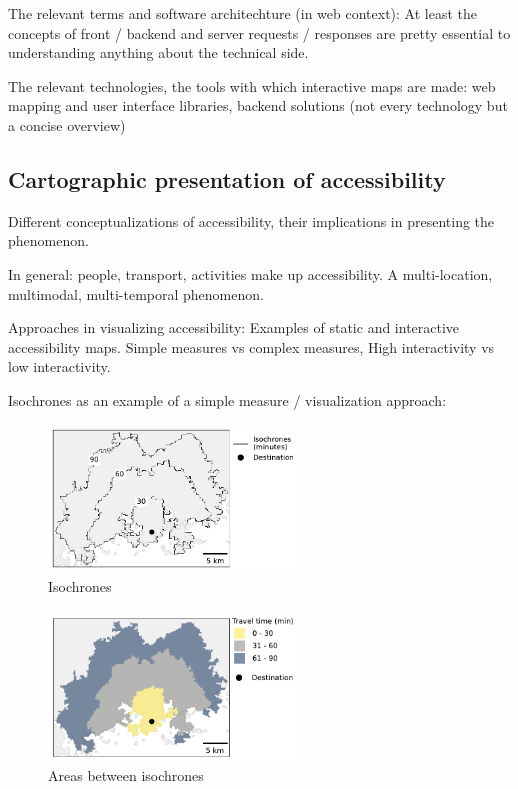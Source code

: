 The relevant terms and software architechture (in web context):
At least the concepts of front / backend and server requests / responses
are pretty essential to understanding anything about the technical side.

The relevant technologies, the tools with which interactive maps are made:
web mapping and user interface libraries, backend solutions
(not every technology but a concise overview)

\subsection{Cartographic presentation of accessibility}

Different conceptualizations of accessibility,
their implications in presenting the phenomenon.

In general: people, transport, activities make up accessibility.
A multi-location, multimodal, multi-temporal phenomenon.

Approaches in visualizing accessibility:
Examples of static and interactive accessibility maps.
Simple measures vs complex measures,
High interactivity vs low interactivity.

Isochrones as an example of a simple measure / visualization approach:

\begin{figure}[H]
	\centering
	\includegraphics[width=0.6\textwidth]{visual/figures/ttm/isochrone_lines.pdf}
	\caption{Isochrones}
	\label{fig:isochrone lines}
\end{figure}

\begin{figure}[H]
	\centering
	\includegraphics[width=0.6\textwidth]{visual/figures/ttm/isochrone_areas.pdf}
	\caption{Areas between isochrones}
	\label{fig:isochrone areas}
\end{figure}


